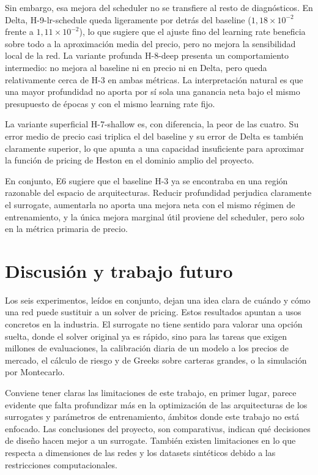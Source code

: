 \documentclass[11pt,a4paper]{article}
\begin{document}
Sin embargo, esa mejora del scheduler no se transfiere al resto de diagnósticos. En Delta, H-9-lr-schedule queda ligeramente por detrás del baseline ($1{,}18\times10^{-2}$ frente a $1{,}11\times10^{-2}$), lo que sugiere que el ajuste fino del learning rate beneficia sobre todo a la aproximación media del precio, pero no mejora la sensibilidad local de la red. La variante profunda H-8-deep presenta un comportamiento intermedio: no mejora al baseline ni en precio ni en Delta, pero queda relativamente cerca de H-3 en ambas métricas. La interpretación natural es que una mayor profundidad no aporta por sí sola una ganancia neta bajo el mismo presupuesto de épocas y con el mismo learning rate fijo.

La variante superficial H-7-shallow es, con diferencia, la peor de las cuatro. Su error medio de precio casi triplica el del baseline y su error de Delta es también claramente superior, lo que apunta a una capacidad insuficiente para aproximar la función de pricing de Heston en el dominio amplio del proyecto.

En conjunto, E6 sugiere que el baseline H-3 ya se encontraba en una región razonable del espacio de arquitecturas. Reducir profundidad perjudica claramente el surrogate, aumentarla no aporta una mejora neta con el mismo régimen de entrenamiento, y la única mejora marginal útil proviene del scheduler, pero solo en la métrica primaria de precio.


\section{Discusión y trabajo futuro}\label{sec:discusion}

Los seis experimentos, leídos en conjunto, dejan una idea clara de cuándo y cómo una red puede sustituir a un solver de pricing. Estos resultados apuntan a usos concretos en la industria. El surrogate no tiene sentido para valorar una opción suelta, donde el solver original ya es rápido, sino para las tareas que exigen millones de evaluaciones, la calibración diaria de un modelo a los precios de mercado, el cálculo de riesgo y de Greeks sobre carteras grandes, o la simulación por Montecarlo.

Conviene tener claras las limitaciones de este trabajo, en primer lugar, parece evidente que falta profundizar más en la optimización de las arquitecturas de los surrogates y parámetros de entrenamiento, ámbitos donde este trabajo no está enfocado. Las conclusiones del proyecto, son comparativas, indican qué decisiones de diseño hacen mejor a un surrogate. También existen limitaciones en lo que respecta a dimensiones de las redes y los datasets sintéticos debido a las restricciones computacionales. 
\end{document}

